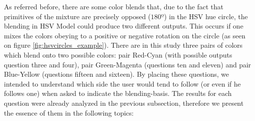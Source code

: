 %
As referred before, there are some color blends that, due to the fact that primitives of the mixture are precisely opposed ($180º$) in the HSV hue circle, the blending in HSV Model could produce two different outputs.
This occurs if one mixes the colors obeying to a positive or negative rotation on the circle (as seen on figure \ref{fig:hsvcircles_example}). There are in this study three pairs of colors which blend onto two possible
colors: pair Red-Cyan (with possible outputs question three and four), pair Green-Magenta (questions ten and eleven) and pair Blue-Yellow (questions fifteen and sixteen). By placing these questions, we intended to
understand which side the user would tend to follow (or even if he follows one) when asked to indicate the blending-basis. The results for each question were already analyzed in the previous subsection, therefore we
present the essence of them in the following topics:
%
